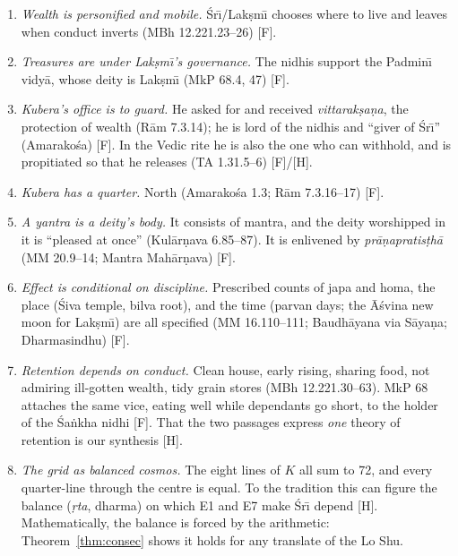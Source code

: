 \documentclass[pdflatex,sn-basic]{sn-jnl}
\theoremstyle{thmstyleone}
\theoremstyle{thmstylethree}
\newcommand{\Fact}{\textsf{[F]}}
\newcommand{\Hyp}{\textsf{[H]}}
\begin{document}
\begin{enumerate}
\item[E1] \emph{Wealth is personified and mobile.} \'Sr\=\i/Lak\d sm\=\i{} chooses where to live and leaves when conduct inverts (MBh 12.221.23--26) \Fact.
\item[E2] \emph{Treasures are under Lak\d sm\=\i's governance.} The nidhis support the Padmin\=\i{} vidy\=a, whose deity is Lak\d sm\=\i{} (MkP 68.4, 47) \Fact.
\item[E3] \emph{Kubera's office is to guard.} He asked for and received \emph{vittarak\d sa\d na}, the protection of wealth (R\=am 7.3.14); he is lord of the nidhis and ``giver of \'Sr\=\i'' (Amarako\'sa) \Fact. In the Vedic rite he is also the one who can withhold, and is propitiated so that he releases (TA 1.31.5--6) \Fact/\Hyp.
\item[E4] \emph{Kubera has a quarter.} North (Amarako\'sa 1.3; R\=am 7.3.16--17) \Fact.
\item[E5] \emph{A yantra is a deity's body.} It consists of mantra, and the deity worshipped in it is ``pleased at once'' (Kul\=ar\d nava 6.85--87). It is enlivened by \emph{pr\=a\d napratis\d th\=a} (MM 20.9--14; Mantra Mah\=ar\d nava) \Fact.
\item[E6] \emph{Effect is conditional on discipline.} Prescribed counts of japa and homa, the place (\'Siva temple, bilva root), and the time (parvan days; the \=A\'svina new moon for Lak\d sm\=\i) are all specified (MM 16.110--111; Baudh\=ayana via S\=aya\d na; Dharmasindhu) \Fact.
\item[E7] \emph{Retention depends on conduct.} Clean house, early rising, sharing food, not admiring ill-gotten wealth, tidy grain stores (MBh 12.221.30--63). MkP 68 attaches the same vice, eating well while dependants go short, to the holder of the \'Sa\.nkha nidhi \Fact. That the two passages express \emph{one} theory of retention is our synthesis \Hyp.
\item[E8] \emph{The grid as balanced cosmos.} The eight lines of $K$ all sum to 72, and every quarter-line through the centre is equal. To the tradition this can figure the balance (\emph{\d rta}, dharma) on which E1 and E7 make \'Sr\=\i{} depend \Hyp. Mathematically, the balance is forced by the arithmetic: Theorem~\ref{thm:consec} shows it holds for any translate of the Lo Shu.
\end{enumerate}
\end{document}
